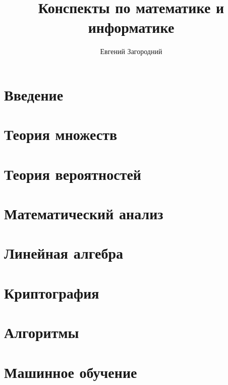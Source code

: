 \documentclass[a4paper]{book}
\title{Конспекты по математике и информатике}
\author{Евгений Загородний}
\begin{document}
\frontmatter
\maketitle

\chapter{Введение}

\mainmatter

\chapter{Теория множеств}
\chapter{Теория вероятностей}
\chapter{Математический анализ}
\chapter{Линейная алгебра}
\chapter{Криптография}
\chapter{Алгоритмы}
\chapter{Машинное обучение}

\appendix

\backmatter
\end{document}

